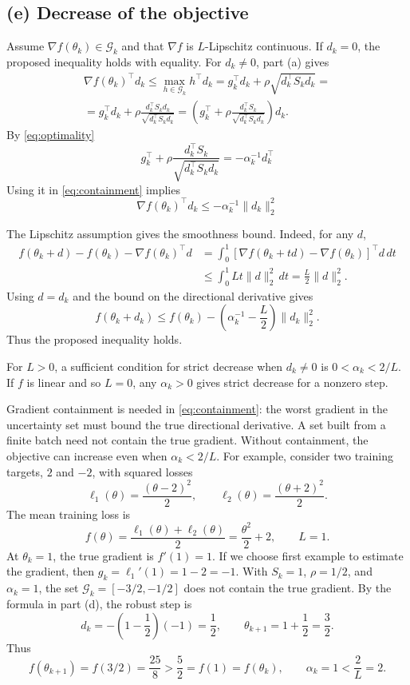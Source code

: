 \documentclass[11pt,a4paper]{article}
\begin{document}
\subsection*{(e) Decrease of the objective}

Assume $\nabla f(\theta_k)\in\mathcal G_k$ and that $\nabla f$ is
$L$-Lipschitz continuous. If $d_k=0$, the proposed inequality holds
with equality. For $d_k\neq0$, part (a) gives
\begin{equation}
    \begin{gathered}
    \nabla f(\theta_k)^\top d_k
    \leq\max_{h\in\mathcal G_k}h^\top d_k
    =g_k^\top d_k+\rho\sqrt{d_k^\top S_kd_k} = \\ =
    g_k^\top d_k+\rho\frac{d_k^\top S_kd_k}{\sqrt{d_k^\top S_kd_k}} = \left(g_k^\top +\rho\frac{d_k^\top S_k}{\sqrt{d_k^\top S_k d_k}}\right)d_k.
    \end{gathered}
    \label{eq:containment}
\end{equation}
By \eqref{eq:optimality}
\[
g_k^\top +\rho\frac{d_k^\top S_k}{\sqrt{d_k^\top S_k d_k}} = -\alpha_k^{-1} d_k^\top
\]
Using it in \eqref{eq:containment} implies
\[
\nabla f(\theta_k)^\top d_k \le -\alpha_k^{-1} \|d_k\|^2_2
\]

The Lipschitz assumption gives the smoothness bound. Indeed, for any $d$,
\begin{align*}
    f(\theta_k+d)-f(\theta_k)-\nabla f(\theta_k)^\top d
    &=\int_0^1
      [\nabla f(\theta_k+td)-\nabla f(\theta_k)]^\top d\,dt\\
    &\leq\int_0^1 Lt\|d\|_2^2\,dt
     =\frac L2\|d\|_2^2.
\end{align*}
Using $d=d_k$ and the bound on the directional derivative gives
\[
    f(\theta_k+d_k)
    \leq f(\theta_k)
        -\left(\alpha_k^{-1}-\frac L2\right)\|d_k\|_2^2.
\]
Thus the proposed inequality holds.

For $L>0$, a sufficient condition for strict decrease when $d_k\neq 0$
is $0<\alpha_k<2/L$.
If $f$ is linear and so $L=0$, any $\alpha_k>0$ gives strict decrease for a nonzero step.

Gradient containment is needed in \eqref{eq:containment}: the worst
gradient in the uncertainty set must bound the true directional
derivative. A set built from a finite batch need not contain the true
gradient. Without containment, the objective can increase even when
$\alpha_k<2/L$. For example, consider two training targets, $2$ and $-2$,
with squared losses
\[
    \ell_1(\theta)=\frac{(\theta-2)^2}{2},
    \qquad
    \ell_2(\theta)=\frac{(\theta+2)^2}{2}.
\]
The mean training loss is
\[
    f(\theta)=\frac{\ell_1(\theta)+\ell_2(\theta)}{2}
    =\frac{\theta^2}{2}+2,
    \qquad L=1.
\]
At $\theta_k=1$, the true gradient is $f'(1)=1$.
If we choose first example to estimate the gradient,
then $g_k=\ell_1'(1)=1-2=-1$.
With $S_k=1$, $\rho=1/2$, and $\alpha_k=1$, the set
$\mathcal G_k=[-3/2,-1/2]$ does not contain the true gradient.
By the formula in part (d), the robust step is
\[
    d_k=-\left(1-\frac12\right)(-1)=\frac12,
    \qquad \theta_{k+1}=1+\frac12=\frac32.
\]
Thus
\[
    f(\theta_{k+1})=f(3/2)=\frac{25}{8}>\frac52=f(1)=f(\theta_k),
    \qquad \alpha_k=1<\frac{2}{L}=2.
\]
\end{document}
